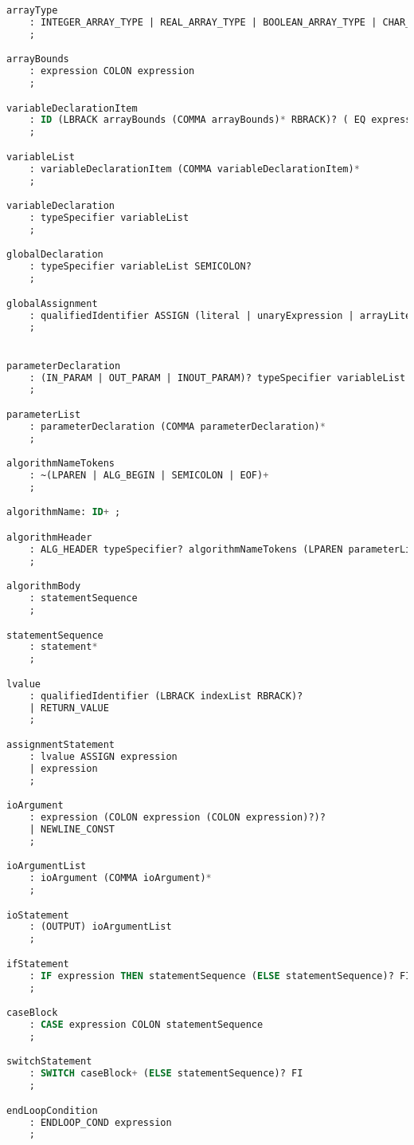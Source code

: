 \begin{lstlisting}[language=sql, caption={Парсер грамматики в формате ANTRL}, label=lst:kafka-click2]
arrayType
    : INTEGER_ARRAY_TYPE | REAL_ARRAY_TYPE | BOOLEAN_ARRAY_TYPE | CHAR_ARRAY_TYPE | STRING_ARRAY_TYPE
    ;

arrayBounds
    : expression COLON expression
    ;

variableDeclarationItem
    : ID (LBRACK arrayBounds (COMMA arrayBounds)* RBRACK)? ( EQ expression )?
    ;

variableList
    : variableDeclarationItem (COMMA variableDeclarationItem)*
    ;

variableDeclaration
    : typeSpecifier variableList
    ;

globalDeclaration
    : typeSpecifier variableList SEMICOLON?
    ;

globalAssignment
    : qualifiedIdentifier ASSIGN (literal | unaryExpression | arrayLiteral) SEMICOLON?
    ;


parameterDeclaration
    : (IN_PARAM | OUT_PARAM | INOUT_PARAM)? typeSpecifier variableList
    ;

parameterList
    : parameterDeclaration (COMMA parameterDeclaration)*
    ;

algorithmNameTokens
    : ~(LPAREN | ALG_BEGIN | SEMICOLON | EOF)+
    ;

algorithmName: ID+ ;

algorithmHeader
    : ALG_HEADER typeSpecifier? algorithmNameTokens (LPAREN parameterList? RPAREN)? SEMICOLON?
    ;

algorithmBody
    : statementSequence
    ;

statementSequence
    : statement*
    ;

lvalue
    : qualifiedIdentifier (LBRACK indexList RBRACK)?
    | RETURN_VALUE
    ;

assignmentStatement
    : lvalue ASSIGN expression
    | expression
    ;

ioArgument
    : expression (COLON expression (COLON expression)?)?
    | NEWLINE_CONST 
    ;

ioArgumentList
    : ioArgument (COMMA ioArgument)*
    ;

ioStatement
    : (OUTPUT) ioArgumentList
    ;

ifStatement
    : IF expression THEN statementSequence (ELSE statementSequence)? FI
    ;

caseBlock
    : CASE expression COLON statementSequence
    ;

switchStatement
    : SWITCH caseBlock+ (ELSE statementSequence)? FI
    ;

endLoopCondition
    : ENDLOOP_COND expression
    ;


\end{lstlisting}
